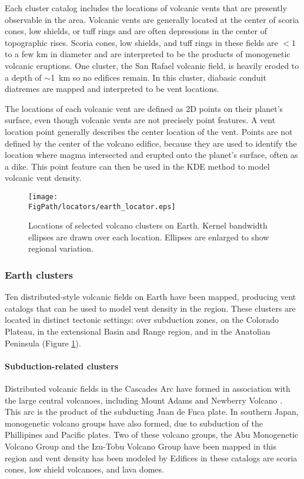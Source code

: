 Each cluster catalog includes the locations of volcanic vents that are presently observable in the area. Volcanic vents are generally located at the center of scoria cones, low shields, or tuff rings and are often depressions in the center of topographic rises. Scoria cones, low shields, and tuff rings in these fields are $<1$ to a few km in diameter and are interpreted to be the products of monogenetic volcanic eruptions. One cluster, the San Rafael volcanic field, is heavily eroded to a depth of $\sim$1~km so no edifices remain. In this cluster, diabasic conduit diatremes are mapped and interpreted to be vent locations.

The locations of each volcanic vent are defined as 2D points on their planet's surface, even though volcanic vents are not precisely point features. A vent location point generally describes the center location of the vent. Points are not defined by the center of the volcano edifice, because they are used to identify the location where magma intersected and erupted onto the planet's surface, often as a dike. This point feature can then be used in the KDE method to model volcanic vent density.

\begin{figure}
\centering
\texttt{[image: \\FigPath/locators/earth\_locator.eps]}
\caption[Locations of selected volcano clusters on Earth]{Locations of selected volcano clusters on Earth. Kernel bandwidth ellipses are drawn over each location. Ellipses are enlarged to show regional variation.}
\label{fig_earthlocator}
\end{figure}

\subsubsection{Earth clusters}
Ten distributed-style volcanic fields on Earth have been mapped, producing vent catalogs that can be used to model vent density in the region. These clusters are located in distinct tectonic settings: over subduction zones, on the Colorado Plateau, in the extensional Basin and Range region, and in the Anatolian Peninsula (Figure \ref{fig_earthlocator}).

\paragraph{Subduction-related clusters} 
Distributed volcanic fields in the Cascades Arc have formed in association with the large central volcanoes, including Mount Adams \citep{barron2014database} and Newberry Volcano \citep{bard2013database}. This arc is the product of the subducting Juan de Fuca plate. In southern Japan, monogenetic volcano groups have also formed, due to subduction of the Phillipines and Pacific plates. Two of these volcano groups, the Abu Monogenetic Volcano Group and the Izu-Tobu Volcano Group have been mapped in this region \citep{kiyosugi2010relationships} and vent density has been modeled by \citet{kiyosugi2012relationship} Edifices in these catalogs are scoria cones, low shield volcanoes, and lava domes.

